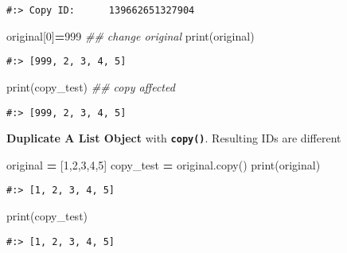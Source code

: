 \documentclass[
]{book}
\newenvironment{Shaded}{\begin{snugshade}}{\end{snugshade}}
\newcommand{\BuiltInTok}[1]{#1}
\newcommand{\CommentTok}[1]{\textcolor[rgb]{0.37,0.37,0.37}{\textit{#1}}}
\newcommand{\DecValTok}[1]{\textcolor[rgb]{0.06,0.06,0.06}{#1}}
\newcommand{\NormalTok}[1]{#1}
\newcommand{\OperatorTok}[1]{\textcolor[rgb]{0.43,0.43,0.43}{\textbf{#1}}}
\begin{document}
\begin{verbatim}
#:> Copy ID:      139662651327904
\end{verbatim}

\begin{Shaded}
\begin{Highlighting}[]
\NormalTok{original[}\DecValTok{0}\NormalTok{]}\OperatorTok{=}\DecValTok{999}   \CommentTok{\#\# change original}
\BuiltInTok{print}\NormalTok{(original)}
\end{Highlighting}
\end{Shaded}

\begin{verbatim}
#:> [999, 2, 3, 4, 5]
\end{verbatim}

\begin{Shaded}
\begin{Highlighting}[]
\BuiltInTok{print}\NormalTok{(copy\_test)  }\CommentTok{\#\# copy affected}
\end{Highlighting}
\end{Shaded}

\begin{verbatim}
#:> [999, 2, 3, 4, 5]
\end{verbatim}

\textbf{Duplicate A List Object} with \textbf{\texttt{copy()}}. Resulting IDs are different

\begin{Shaded}
\begin{Highlighting}[]
\NormalTok{original }\OperatorTok{=}\NormalTok{ [}\DecValTok{1}\NormalTok{,}\DecValTok{2}\NormalTok{,}\DecValTok{3}\NormalTok{,}\DecValTok{4}\NormalTok{,}\DecValTok{5}\NormalTok{]}
\NormalTok{copy\_test }\OperatorTok{=}\NormalTok{ original.copy()}
\BuiltInTok{print}\NormalTok{(original)}
\end{Highlighting}
\end{Shaded}

\begin{verbatim}
#:> [1, 2, 3, 4, 5]
\end{verbatim}

\begin{Shaded}
\begin{Highlighting}[]
\BuiltInTok{print}\NormalTok{(copy\_test)}
\end{Highlighting}
\end{Shaded}

\begin{verbatim}
#:> [1, 2, 3, 4, 5]
\end{verbatim}
\end{document}
